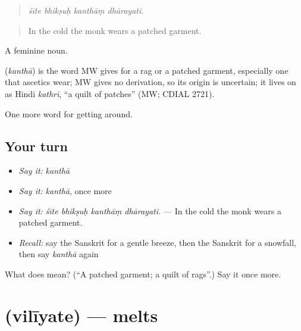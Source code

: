 \begin{quote}
   
\end{quote}

\begin{quote}
\emph{śīte bhikṣuḥ kanthāṃ dhārayati.}
\end{quote}

\begin{quote}
In the cold the monk wears a patched garment.
\end{quote}

A feminine noun.

\begin{cousinweb}
\textbf{} (\emph{kanthā}) is the word MW gives for a rag or a patched garment, especially one that ascetics wear; MW gives no derivation, so its origin is uncertain; it lives on as Hindi \emph{kathrī}, \textquotedblleft{}a quilt of patches\textquotedblright{} (MW; CDIAL 2721).
\end{cousinweb}

\begin{grammarlens}[title={What you've built}]
One more word for getting around.
\end{grammarlens}

\subsection*{Your turn}
\begin{itemize}
\raggedright
  \item \emph{Say it:} \emph{kanthā}
  \item \emph{Say it:} \emph{kanthā}, once more
  \item \emph{Say it:} \emph{śīte bhikṣuḥ kanthāṃ dhārayati.} — In the cold the monk wears a patched garment.
  \item \emph{Recall:} say the Sanskrit for a gentle breeze, then the Sanskrit for a snowfall, then say \emph{kanthā} again
\end{itemize}

\begin{tcolorbox}[breakable,colback=teal!4,colframe=teal!35!black,title={Before you move on}]
What does  mean? (\textquotedblleft{}A patched garment; a quilt of rags\textquotedblright{}.) Say it once more.
\end{tcolorbox}
\section[\texorpdfstring{\sk{विलीयते} (vilīyate)}{विलीयते (vilīyate)}]{ (vilīyate) — melts}

